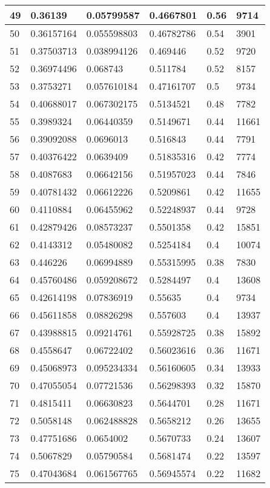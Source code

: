 \begin{longtable}{|l|l|l|l|l|l|}
49 & 0.36139 & 0.05799587 & 0.4667801 & 0.56 & 9714 \\ \hline 
50 & 0.36157164 & 0.055598803 & 0.46782786 & 0.54 & 3901 \\ \hline 
51 & 0.37503713 & 0.038994126 & 0.469446 & 0.52 & 9720 \\ \hline 
52 & 0.36974496 & 0.068743 & 0.511784 & 0.52 & 8157 \\ \hline 
53 & 0.3753271 & 0.057610184 & 0.47161707 & 0.5 & 9734 \\ \hline 
54 & 0.40688017 & 0.067302175 & 0.5134521 & 0.48 & 7782 \\ \hline 
55 & 0.3989324 & 0.06440359 & 0.5149671 & 0.44 & 11661 \\ \hline 
56 & 0.39092088 & 0.0696013 & 0.516843 & 0.44 & 7791 \\ \hline 
57 & 0.40376422 & 0.0639409 & 0.51835316 & 0.42 & 7774 \\ \hline 
58 & 0.4087683 & 0.06642156 & 0.51957023 & 0.44 & 7846 \\ \hline 
59 & 0.40781432 & 0.06612226 & 0.5209861 & 0.42 & 11655 \\ \hline 
60 & 0.4110884 & 0.06455962 & 0.52248937 & 0.44 & 9728 \\ \hline 
61 & 0.42879426 & 0.08573237 & 0.5501358 & 0.42 & 15851 \\ \hline 
62 & 0.4143312 & 0.05480082 & 0.5254184 & 0.4 & 10074 \\ \hline 
63 & 0.446226 & 0.06994889 & 0.55315995 & 0.38 & 7830 \\ \hline 
64 & 0.45760486 & 0.059208672 & 0.5284497 & 0.4 & 13608 \\ \hline 
65 & 0.42614198 & 0.07836919 & 0.55635 & 0.4 & 9734 \\ \hline 
66 & 0.45611858 & 0.08826298 & 0.557603 & 0.4 & 13937 \\ \hline 
67 & 0.43988815 & 0.09214761 & 0.55928725 & 0.38 & 15892 \\ \hline 
68 & 0.4558647 & 0.06722402 & 0.56023616 & 0.36 & 11671 \\ \hline 
69 & 0.45068973 & 0.095234334 & 0.56160605 & 0.34 & 13933 \\ \hline 
70 & 0.47055054 & 0.07721536 & 0.56298393 & 0.32 & 15870 \\ \hline 
71 & 0.4815411 & 0.06630823 & 0.5644701 & 0.28 & 11671 \\ \hline 
72 & 0.5058148 & 0.062488828 & 0.5658212 & 0.26 & 13655 \\ \hline 
73 & 0.47751686 & 0.0654002 & 0.5670733 & 0.24 & 13607 \\ \hline 
74 & 0.5067829 & 0.05790584 & 0.5681474 & 0.22 & 13597 \\ \hline 
75 & 0.47043684 & 0.061567765 & 0.56945574 & 0.22 & 11682 \\ \hline 
\end{longtable}